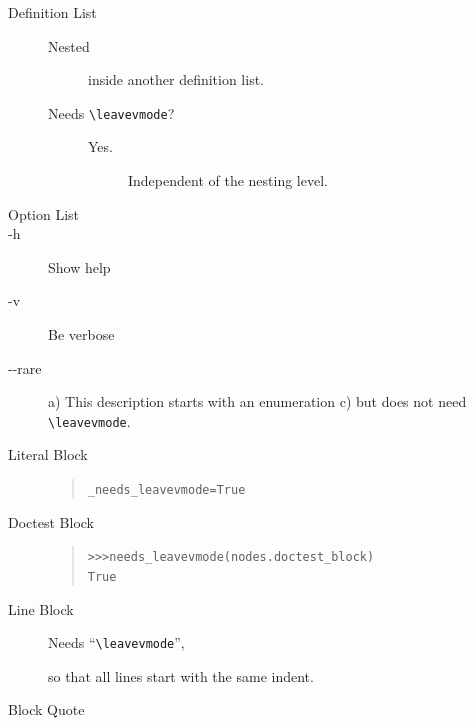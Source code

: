 \documentclass[a4paper]{article}
\newenvironment{DUlineblock}[1]{%
    \list{}{\setlength{\partopsep}{\parskip}
            \addtolength{\partopsep}{\baselineskip}
            \setlength{\topsep}{0pt}
            \setlength{\itemsep}{0.15\baselineskip}
            \setlength{\parsep}{0pt}
            \setlength{\leftmargin}{#1}}
    \raggedright
  }
  {\endlist}
\providecommand*{\DUoptionlistlabel}[1]{\bfseries #1 \hfill}
\newenvironment{DUoptionlist}{%
    \list{}{\setlength{\labelwidth}{\DUoptionlistindent}
            \setlength{\rightmargin}{1cm}
            \setlength{\leftmargin}{\rightmargin}
            \addtolength{\leftmargin}{\labelwidth}
            \addtolength{\leftmargin}{\labelsep}
            \renewcommand{\makelabel}{\DUoptionlistlabel}}
  }
  {\endlist}
\begin{document}
\begin{description}
\item[{Definition List}] \leavevmode
\begin{description}
\item[{Nested}] 
inside another definition list.

\item[{Needs \texttt{\textbackslash{}leavevmode}?}] \leavevmode
\begin{description}
\item[{Yes.}] 
Independent of the nesting level.
\end{description}
\end{description}

\item[{Option List}] \leavevmode
\begin{DUoptionlist}
\item[-h]  Show help

\item[-v]  Be verbose

\item[-{}-rare]  a) This description starts with an enumeration
c) but does not need \texttt{\textbackslash{}leavevmode}.
\end{DUoptionlist}

\item[{Literal Block}] \leavevmode
\begin{quote}
\begin{alltt}
_needs_leavevmode  = True
\end{alltt}
\end{quote}

\item[{Doctest Block}] \leavevmode
\begin{quote}
\begin{alltt}
>>> needs_leavevmode(nodes.doctest_block)
True
\end{alltt}
\end{quote}

\item[{Line Block}] \leavevmode
\begin{DUlineblock}{0em}
\item[] Needs “\texttt{\textbackslash{}leavevmode}”,
\item[] so that all lines start with the same indent.
\end{DUlineblock}

\item[{Block Quote}] \leavevmode
% 


\end{description}
\end{document}
